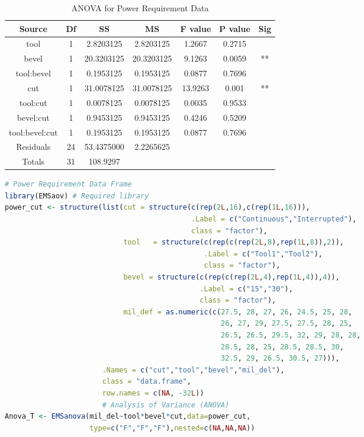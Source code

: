 \documentclass{WileySev}
\begin{document}
\begin{table}
\caption{ANOVA for Power Requirement Data}
\centering
\begin{tabular}{|c|c|c|c|c|cc|}
\hline
Source    &      Df&   SS     &     MS   & F value & P value & Sig \\
\hline
tool      &      1 & 2.8203125& 2.8203125&  1.2667 &0.2715   &     \\            
bevel     &      1 &20.3203125&20.3203125&  9.1263 &0.0059   &**   \\     
tool:bevel&      1 & 0.1953125& 0.1953125&  0.0877 &0.7696   &     \\ 
cut       &      1 &31.0078125&31.0078125& 13.9263 &0.001    &**   \\ 
tool:cut  &      1 & 0.0078125& 0.0078125&  0.0035 &0.9533   &     \\  
bevel:cut &      1 & 0.9453125& 0.9453125&  0.4246 &0.5209   &     \\ 
tool:bevel:cut & 1 & 0.1953125& 0.1953125&  0.0877 &0.7696   &     \\
Residuals      & 24&53.4375000& 2.2265625&         &         &     \\     
\hline
Totals         & 31&108.9297  &          &         &         &     \\
\hline
\end{tabular}
\label{tab:anova_cut_tool}
\end{table} 

\begin{lstlisting}[language=R]
# Power Requirement Data Frame
library(EMSaov) # Required library
power_cut <- structure(list(cut = structure(c(rep(2L,16),c(rep(1L,16))),
                                            .Label = c("Continuous","Interrupted"),
                                            class = "factor"),
                            tool   = structure(c(rep(c(rep(2L,8),rep(1L,8)),2)),
                                               .Label = c("Tool1","Tool2"),
                                               class = "factor"),
                            bevel = structure(c(rep(c(rep(2L,4),rep(1L,4)),4)),
                                              .Label = c("15","30"),
                                              class = "factor"),
                            mil_def = as.numeric(c(27.5, 28, 27, 26, 24.5, 25, 28,
                                                   26, 27, 29, 27.5, 27.5, 28, 25,
                                                   26.5, 26.5, 29.5, 32, 29, 28, 28,
                                                   28.5, 28, 25, 28.5, 28.5, 30,
                                                   32.5, 29, 26.5, 30.5, 27))),
                       .Names = c("cut","tool","bevel","mil_del"),
                       class = "data.frame",
                       row.names = c(NA, -32L))
                       # Analysis of Variance (ANOVA)
Anova_T <- EMSanova(mil_del~tool*bevel*cut,data=power_cut,
                    type=c("F","F","F"),nested=c(NA,NA,NA))
\end{lstlisting}
\end{document}
